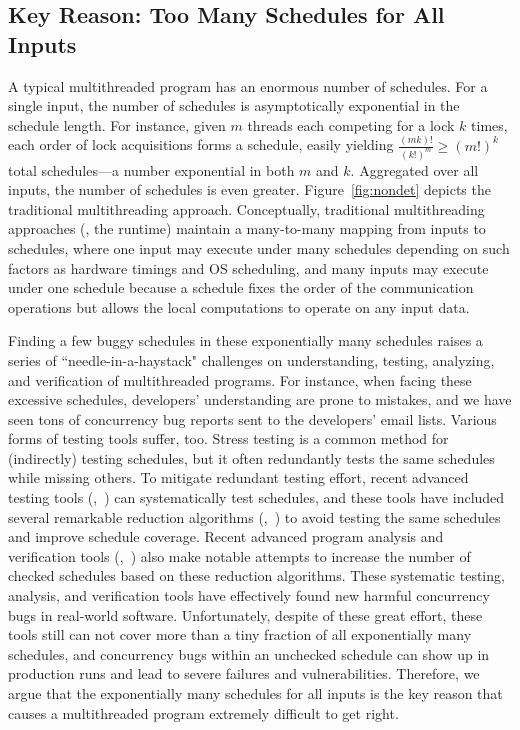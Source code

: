 \subsection{Key Reason: Too Many Schedules for All Inputs}

A typical multithreaded program has an enormous number of schedules.  For
a single input, the number of schedules is asymptotically exponential in
the schedule length.  For instance, given $m$ threads each competing for a
lock $k$ times, each order of lock acquisitions forms a schedule, easily
yielding $\frac{(mk)!}{(k!)^m} \ge (m!)^k$ total schedules---a number
exponential in both $m$ and $k$. Aggregated over all inputs, the number of
schedules is even greater. Figure~\ref{fig:nondet} depicts the traditional
multithreading approach. Conceptually, traditional multithreading approaches
(\eg, the \pthread runtime) maintain a many-to-many mapping from inputs to 
schedules, where one input may execute under many schedules depending on such 
factors as hardware timings and OS scheduling, and many inputs may execute 
under one schedule because a schedule fixes the order of the communication 
operations but allows the local computations to operate on any input data.

Finding a few buggy schedules in these exponentially many schedules raises
a series of ``needle-in-a-haystack" challenges on understanding, testing,
analyzing, and verification of multithreaded programs. For
instance, when facing these excessive schedules, developers' understanding are 
prone to mistakes, and we have seen tons of concurrency bug reports sent to the 
developers' email lists. Various forms of testing tools suffer, too.  Stress 
testing is a common method for (indirectly) testing schedules, but it often 
redundantly tests the same schedules while missing others. To mitigate 
redundant testing effort, recent advanced testing tools 
(\eg,~\cite{musuvathi:chess:osdi08, modist:nsdi09, dbug:ssv10, demeter:sosp11}) 
can systematically test schedules, and these tools have included several 
remarkable reduction algorithms (\eg,~\cite{flanagan:dynamicpo, 
demeter:sosp11}) to avoid testing the same schedules and improve schedule 
coverage. Recent advanced program analysis and verification tools 
(\eg,~\cite{demeter:sosp11}) also make notable attempts to increase the number 
of checked schedules based on these reduction algorithms. These systematic 
testing, analysis, and verification tools have effectively found new harmful 
concurrency bugs in real-world software. Unfortunately, despite of these great
effort, these tools still can not cover more than a tiny fraction of all
exponentially many schedules, and concurrency bugs within an unchecked schedule
can show up in production runs and lead to severe failures and vulnerabilities. 
Therefore, we argue that the exponentially many schedules for all inputs is the 
key reason that causes a multithreaded program extremely difficult to get right.


